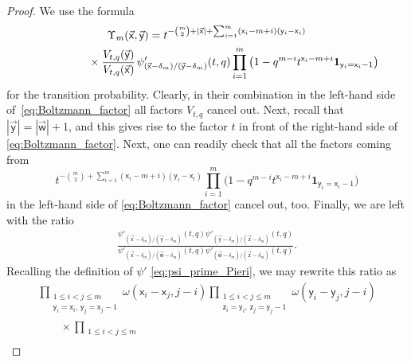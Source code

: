 \documentclass[pdftex]{sigma}
\numberwithin{equation}{section}
\begin{document}
\begin{proof}
	We use the formula 	
	\begin{gather*}
		\Upsilon_m(\vec{\mathsf{x}},\vec{\mathsf{y}})=
		t^{-\binom m2+|\vec{\mathsf{x}}|
		+\sum_{i=1}^{m}
		(\mathsf{x}_{i}-m+i)(\mathsf{y}_{i}-\mathsf{x}_{i})}	
	\\
\hphantom{\Upsilon_m(\vec{\mathsf{x}},\vec{\mathsf{y}})=}{}\times
		\frac{V_{t,q}(\vec{\mathsf{y}})}{V_{t,q}(\vec{\mathsf{x}})}
		\hspace{1pt}
		\psi'_{(\vec{\mathsf{x}}-\delta_m)/(\vec{\mathsf{y}}-\delta_m)}(t,q)
		\prod_{i=1}^{m}
		\big( 1-q^{m-i}t^{\mathsf{x}_i-m+i}\mathbf{1}_{\mathsf{y}_i=\mathsf{x}_i-1} \big)
	\end{gather*}
	for the transition probability.
	Clearly, in their combination
	in the left-hand side of~\eqref{eq:Boltzmann_factor}
	all factors $V_{t,q}$ cancel out.
	Next, recall that $|\vec{\mathsf{y}}|=|\vec{\mathsf{w}}|+1$,
	and this gives rise to the factor $t$ in front of
	the right-hand side of \eqref{eq:Boltzmann_factor}.
	Next, one can readily check that all the
	factors coming from
	\begin{equation*}
		t^{-\binom m2
		+\sum_{i=1}^{m}
		(\mathsf{x}_{i}-m+i)(\mathsf{y}_{i}-\mathsf{x}_{i})}
		\prod_{i=1}^{m}
		\big( 1-q^{m-i}t^{\mathsf{x}_i-m+i}
		\mathbf{1}_{\mathsf{y}_i=\mathsf{x}_i-1} \big)
	\end{equation*}
	in the left-hand side of \eqref{eq:Boltzmann_factor}
	cancel out, too.
	Finally, we are left with
	the ratio
	\begin{align*}
		\frac{
		\psi'_{(\vec{\mathsf{x}}-\delta_m)/(\vec{\mathsf{y}}-\delta_m)}(t,q)
		\psi'_{(\vec{\mathsf{y}}-\delta_m)/(\vec{\mathsf{z}}-\delta_m)}(t,q)
		}
		{
		\psi'_{(\vec{\mathsf{x}}-\delta_m)/(\vec{\mathsf{w}}-\delta_m)}(t,q)
		\psi'_{(\vec{\mathsf{w}}-\delta_m)/(\vec{\mathsf{z}}-\delta_m)}(t,q)}.
	\end{align*}
	Recalling the definition of
	$\psi'$ \eqref{eq:psi_prime_Pieri}, we may rewrite this ratio as
	\begin{gather*}
		\prod_{\substack{1\le i<j\le m
		\\
		\mathsf{y}_{i}=\mathsf{x}_{i}
		,\,
		\mathsf{y}_{j}=\mathsf{x}_{j}-1}}
		\omega(\mathsf{x}_i-\mathsf{x}_j,j-i)
		\prod_{\substack{1\le i<j\le m
		\\
		\mathsf{z}_{i}=\mathsf{y}_{i}
		,\,
		\mathsf{z}_{j}=\mathsf{y}_{j}-1}}
		\omega(\mathsf{y}_i-\mathsf{y}_j,j-i)
		\\\qquad{}
		\times
		\prod_{\substack{1\le i<j\le m
		\\
}}
\end{gather*}
\end{proof}
\end{document}

